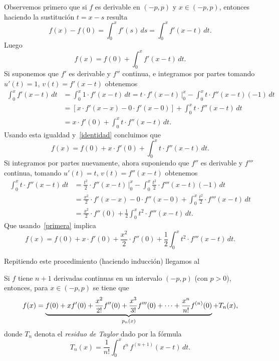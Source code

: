 Observemos primero que si $f$ es derivable en $(-p,p)$ y $x \in (-p,p)$, entonces haciendo la sustitución $t = x - s$ resulta
\[
 f(x) - f(0) = \int_0^x f'(s)\, ds = \int_0^x f'(x-t) \, dt.
\]
Luego
\begin{equation}\label{identidad}
 f(x) = f(0) + \int_0^x f'(x-t) \, dt.
\end{equation}
Si suponemos que $f'$ es derivable y $f''$ continua, e integramos por partes tomando $u'(t) = 1$, $v(t) = f'(x-t)$ obtenemos
\begin{align*}
 \int_0^x f'(x-t) \, dt &= \int_0^x 1 \cdot f'(x-t)\, dt
                         = t \cdot f'(x-t) \, \Big|_0^x - \int_0^x t \cdot f''(x-t) (-1) \, dt \\
&= \left[ x \cdot f'(x-x) - 0 \cdot f'(x-0) \right] + \int_0^x t \cdot f''(x-t) \, dt \\
& = x \cdot f'(0) + \int_0^x t \cdot f''(x-t) \, dt.
\end{align*}
Usando esta igualdad y~\eqref{identidad} concluimos que
\begin{equation}\label{primera}
 f(x) = f(0) + x \cdot f'(0) + \int_0^x t \cdot f''(x-t) \, dt.
\end{equation}
Si integramos por partes nuevamente, ahora suponiendo que $f''$ es derivable y $f'''$ continua, tomando $u'(t) = t$, $v(t) = f''(x-t)$ obtenemos
\begin{align*}
 \int_0^x t \cdot f''(x-t) \, dt &= \frac{t^2}{2} \cdot f''(x-t) \, \Big|_0^x - \int_0^x \frac{t^2}2 \cdot f'''(x-t) (-1) \, dt \\
&= \frac{x^2}2 \cdot f'(x-x) - 0 \cdot f''(x-0) + \int_0^x \frac{t^2}2 \cdot f'''(x-t) \, dt \\
& = \frac{x^2}2 \cdot f''(0) + \frac12 \int_0^x t^2 \cdot f'''(x-t) \, dt.
\end{align*}
Que usando~\eqref{primera} implica
\begin{equation}\label{segunda}
 f(x) = f(0) + x \cdot f'(0) + \frac{x^2}2 \cdot f''(0) +\frac12 \int_0^x t^2 \cdot f'''(x-t) \, dt.
\end{equation}

Repitiendo este procedimiento (haciendo inducción) llegamos al

\begin{theorem}
Si $f$ tiene $n+1$ derivadas continuas en un intervalo $(-p,p)$  (con $p>0$), entonces, para $x \in (-p,p)$ se tiene que
\[
\displaystyle f(x) = 
\underbrace{f(0) + x f'(0) + \frac{x^2}{2!} f''(0) + \frac{x^3}{3!} f'''(0) + \dots 
 +\frac{x^n}{n!} f^{(n)}(0)}_{p_n(x)}
 + T_n(x),
\]
donde $T_n$ denota el \emph{residuo de Taylor} dado por la fórmula
\[
 T_n(x) = \frac{1}{n!} \int_0^x t^n \, f^{(n+1)}(x-t)\, dt.
\]
\end{theorem}


